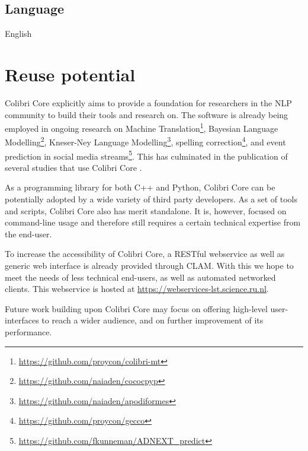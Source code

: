 \subsection*{Language}

English

\section{Reuse potential}

Colibri Core explicitly aims to provide a foundation for researchers in the NLP
community to build their tools and research on. The software is already being
employed in ongoing research on Machine
Translation\footnote{\url{https://github.com/proycon/colibri-mt}}, Bayesian Language
Modelling\footnote{\url{https://github.com/naiaden/cococpyp}}, Kneser-Ney Language
Modelling\footnote{\url{https://github.com/naiaden/apodiformes}}, spelling
correction\footnote{\url{https://github.com/proycon/gecco}}, and event
prediction in social media streams\footnote{\url{https://github.com/fkunneman/ADNEXT\_predict}}.
This has culminated in the publication of several studies that use Colibri Core
\cite{COLIBRITAPILOT,COCOCPYP,Kunneman+16}.

As a programming library for both C++ and Python, Colibri Core can be
potentially adopted by a wide variety of third party developers. As a set of
tools and scripts, Colibri Core also has merit standalone. It is, however,
focused on command-line usage and therefore still requires a certain technical
expertise from the end-user.

To increase the accessibility of Colibri Core, a RESTful webservice as well as
generic web interface is already provided through CLAM\cite{CLAMPAPER}. With this we
hope to meet the needs of less technical end-users, as well as automated
networked clients. This webservice is hosted at
\url{https://webservices-lst.science.ru.nl}.

Future work building upon Colibri Core may focus on offering
high-level user-interfaces to reach a wider audience, and on further
improvement of its performance.

